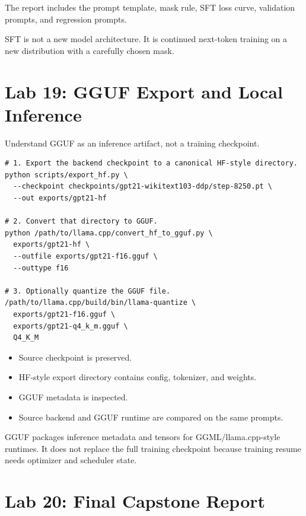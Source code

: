  The report includes the prompt template, mask rule, SFT loss curve, validation prompts, and regression prompts.

 SFT is not a new model architecture. It is continued next-token training on a new distribution with a carefully chosen mask.

\section{Lab 19: GGUF Export and Local Inference}

 Understand GGUF as an inference artifact, not a training checkpoint.


\begin{lstlisting}
# 1. Export the backend checkpoint to a canonical HF-style directory.
python scripts/export_hf.py \
  --checkpoint checkpoints/gpt21-wikitext103-ddp/step-8250.pt \
  --out exports/gpt21-hf

# 2. Convert that directory to GGUF.
python /path/to/llama.cpp/convert_hf_to_gguf.py \
  exports/gpt21-hf \
  --outfile exports/gpt21-f16.gguf \
  --outtype f16

# 3. Optionally quantize the GGUF file.
/path/to/llama.cpp/build/bin/llama-quantize \
  exports/gpt21-f16.gguf \
  exports/gpt21-q4_k_m.gguf \
  Q4_K_M
\end{lstlisting}


\begin{itemize}
  \item Source checkpoint is preserved.
  \item HF-style export directory contains config, tokenizer, and weights.
  \item GGUF metadata is inspected.
  \item Source backend and GGUF runtime are compared on the same prompts.
\end{itemize}

 GGUF packages inference metadata and tensors for GGML/llama.cpp-style runtimes. It does not replace the full training checkpoint because training resume needs optimizer and scheduler state.

\section{Lab 20: Final Capstone Report}


